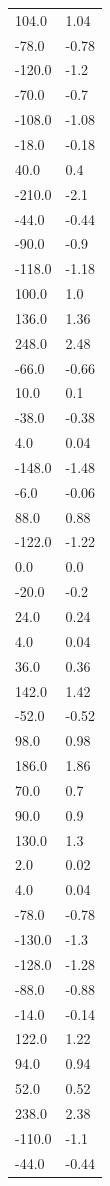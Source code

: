 \begin{longtable}{ll}
104.0 & 1.04 \\
-78.0 & -0.78 \\
-120.0 & -1.2 \\
-70.0 & -0.7 \\
-108.0 & -1.08 \\
-18.0 & -0.18 \\
40.0 & 0.4 \\
-210.0 & -2.1 \\
-44.0 & -0.44 \\
-90.0 & -0.9 \\
-118.0 & -1.18 \\
100.0 & 1.0 \\
136.0 & 1.36 \\
248.0 & 2.48 \\
-66.0 & -0.66 \\
10.0 & 0.1 \\
-38.0 & -0.38 \\
4.0 & 0.04 \\
-148.0 & -1.48 \\
-6.0 & -0.06 \\
88.0 & 0.88 \\
-122.0 & -1.22 \\
0.0 & 0.0 \\
-20.0 & -0.2 \\
24.0 & 0.24 \\
4.0 & 0.04 \\
36.0 & 0.36 \\
142.0 & 1.42 \\
-52.0 & -0.52 \\
98.0 & 0.98 \\
186.0 & 1.86 \\
70.0 & 0.7 \\
90.0 & 0.9 \\
130.0 & 1.3 \\
2.0 & 0.02 \\
4.0 & 0.04 \\
-78.0 & -0.78 \\
-130.0 & -1.3 \\
-128.0 & -1.28 \\
-88.0 & -0.88 \\
-14.0 & -0.14 \\
122.0 & 1.22 \\
94.0 & 0.94 \\
52.0 & 0.52 \\
238.0 & 2.38 \\
-110.0 & -1.1 \\
-44.0 & -0.44 \\

\end{longtable}
